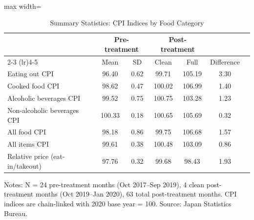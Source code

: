 \begin{table}[H]
\centering
\caption{Summary Statistics: CPI Indices by Food Category}
\begin{threeparttable}
\begin{adjustbox}{max width=\textwidth}
\begin{tabular}{lcccccc}
\toprule
 & \multicolumn{2}{c}{Pre-treatment} & \multicolumn{2}{c}{Post-treatment} & \\
\cmidrule(lr){2-3} \cmidrule(lr){4-5}
 & Mean & SD & Clean & Full & Difference \\
\midrule
Eating out CPI & 96.40 & 0.62 & 99.71 & 105.19 & 3.30 \\
Cooked food CPI & 98.62 & 0.47 & 100.02 & 106.99 & 1.40 \\
Alcoholic beverages CPI & 99.52 & 0.75 & 100.75 & 103.28 & 1.23 \\
Non-alcoholic beverages CPI & 100.33 & 0.18 & 100.65 & 105.69 & 0.32 \\
All food CPI & 98.18 & 0.86 & 99.75 & 106.68 & 1.57 \\
All items CPI & 99.61 & 0.38 & 100.48 & 103.09 & 0.86 \\
Relative price (eat-in/takeout) & 97.76 & 0.32 & 99.68 & 98.43 & 1.93 \\
\bottomrule
\end{tabular}
\end{adjustbox}
\begin{tablenotes}[flushleft]
\small
\item Notes: N = 24 pre-treatment months (Oct 2017--Sep 2019), 4 clean post-treatment months (Oct 2019--Jan 2020), 63 total post-treatment months. CPI indices are chain-linked with 2020 base year = 100. Source: Japan Statistics Bureau.
\end{tablenotes}
\end{threeparttable}
\label{tab:summary}
\end{table}
